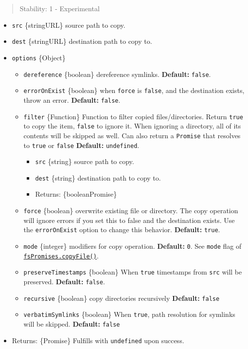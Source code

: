 \begin{quote}
Stability: 1 - Experimental
\end{quote}

\begin{itemize}
\tightlist
\item
  \texttt{src} \{string\textbar URL\} source path to copy.
\item
  \texttt{dest} \{string\textbar URL\} destination path to copy to.
\item
  \texttt{options} \{Object\}

  \begin{itemize}
  \tightlist
  \item
    \texttt{dereference} \{boolean\} dereference symlinks.
    \textbf{Default:} \texttt{false}.
  \item
    \texttt{errorOnExist} \{boolean\} when \texttt{force} is
    \texttt{false}, and the destination exists, throw an error.
    \textbf{Default:} \texttt{false}.
  \item
    \texttt{filter} \{Function\} Function to filter copied
    files/directories. Return \texttt{true} to copy the item,
    \texttt{false} to ignore it. When ignoring a directory, all of its
    contents will be skipped as well. Can also return a \texttt{Promise}
    that resolves to \texttt{true} or \texttt{false} \textbf{Default:}
    \texttt{undefined}.

    \begin{itemize}
    \tightlist
    \item
      \texttt{src} \{string\} source path to copy.
    \item
      \texttt{dest} \{string\} destination path to copy to.
    \item
      Returns: \{boolean\textbar Promise\}
    \end{itemize}
  \item
    \texttt{force} \{boolean\} overwrite existing file or directory. The
    copy operation will ignore errors if you set this to false and the
    destination exists. Use the \texttt{errorOnExist} option to change
    this behavior. \textbf{Default:} \texttt{true}.
  \item
    \texttt{mode} \{integer\} modifiers for copy operation.
    \textbf{Default:} \texttt{0}. See \texttt{mode} flag of
    \hyperref[fspromisescopyfilesrc-dest-mode]{\texttt{fsPromises.copyFile()}}.
  \item
    \texttt{preserveTimestamps} \{boolean\} When \texttt{true}
    timestamps from \texttt{src} will be preserved. \textbf{Default:}
    \texttt{false}.
  \item
    \texttt{recursive} \{boolean\} copy directories recursively
    \textbf{Default:} \texttt{false}
  \item
    \texttt{verbatimSymlinks} \{boolean\} When \texttt{true}, path
    resolution for symlinks will be skipped. \textbf{Default:}
    \texttt{false}
  \end{itemize}
\item
  Returns: \{Promise\} Fulfills with \texttt{undefined} upon success.
\end{itemize}

